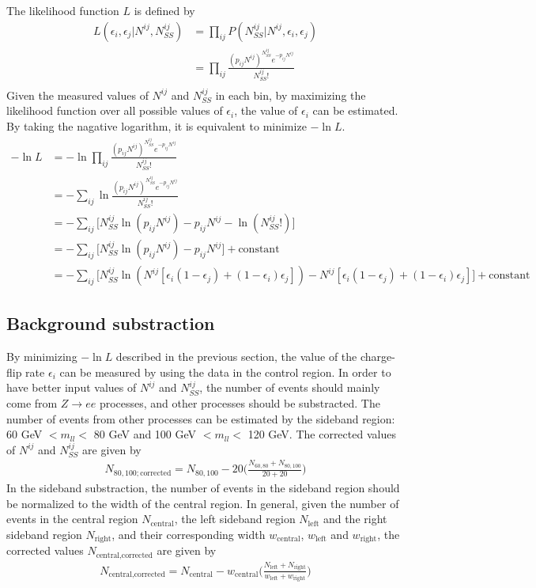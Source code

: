 The likelihood function $L$ is defined by
\begin{align}
L(\epsilon_i,\epsilon_j|N^{ij},N^{ij}_{SS}) &= \prod_{ij} P(N^{ij}_{SS}|N^{ij},\epsilon_i,\epsilon_j) \\
&= \prod_{ij} \frac{ (p_{ij} N^{ij})^{N^{ij}_{SS}} e^{- p_{ij} N^{ij}} }{N^{ij}_{SS}!} \\
\end{align}
Given the measured values of $N^{ij}$ and $N^{ij}_{SS}$ in each bin, by maximizing the likelihood function over all possible values of $\epsilon_i$, the value of $\epsilon_i$ can be estimated.
By taking the nagative logarithm, it is equivalent to minimize $- \ln L$.
\begin{align}
- \ln L
&= - \ln \prod_{ij} \frac{ (p_{ij} N^{ij})^{N^{ij}_{SS}} e^{- p_{ij} N^{ij}} }{N^{ij}_{SS}!} \\
&= - \sum_{ij} \ln \frac{ (p_{ij} N^{ij})^{N^{ij}_{SS}} e^{- p_{ij} N^{ij}} }{N^{ij}_{SS}!} \\
&= - \sum_{ij} \Big[ N^{ij}_{SS} \ln (p_{ij} N^{ij}) - p_{ij} N^{ij} - \ln( N^{ij}_{SS}!) \Big] \\
&= - \sum_{ij} \Big[ N^{ij}_{SS} \ln (p_{ij} N^{ij}) - p_{ij} N^{ij} \Big] + \text{constant} \\
&= - \sum_{ij} \Big[ N^{ij}_{SS} \ln (N^{ij}[\epsilon_i (1-\epsilon_j) + (1-\epsilon_i) \epsilon_j]) - N^{ij}[\epsilon_i (1-\epsilon_j) + (1-\epsilon_i) \epsilon_j] \Big] + \text{constant}
\end{align}

\subsection{Background substraction}
\label{sec:Background_substraction}
By minimizing $- \ln L$ described in the previous section, the value of the charge-flip rate $\epsilon_i$ can be measured by using the data in the control region.
In order to have better input values of $N^{ij}$ and $N^{ij}_{SS}$, the number of events should mainly come from $Z \rightarrow ee$ processes, and other processes should be substracted.
The number of events from other processes can be estimated by the sideband region: 60 GeV $<m_{ll}<$ 80 GeV and 100 GeV $<m_{ll}<$ 120 GeV.
The corrected values of $N^{ij}$ and $N^{ij}_{SS}$ are given by
\begin{align}
N_{80,100;\text{corrected}} = N_{80,100} - 20 \Big( \frac{N_{60,80} + N_{80,100}}{20 + 20} \Big)
\end{align}
In the sideband substraction, the number of events in the sideband region should be normalized to the width of the central region.
In general, given the number of events in the central region $N_{\text{central}}$, the left sideband region $N_{\text{left}}$ and the right sideband region $N_{\text{right}}$, and their corresponding width $w_{\text{central}}$, $w_{\text{left}}$ and $w_{\text{right}}$, the corrected values $N_{\text{central,corrected}}$ are given by
\begin{align}
N_{\text{central,corrected}} = N_{\text{central}} - w_{\text{central}} \Big( \frac{N_{\text{left}} + N_{\text{right}}}{w_{\text{left}} + w_{\text{right}}} \Big)
\end{align}

